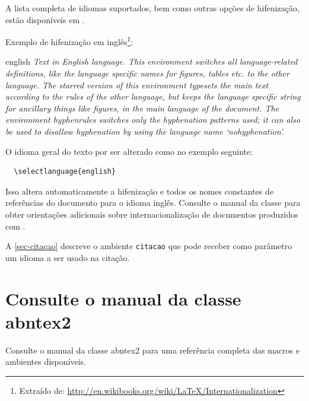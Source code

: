 A lista completa de idiomas suportados, bem como outras opções de hifenização,
estão disponíveis em .

Exemplo de hifenização em inglês\footnote{Extraído de:
\url{http://en.wikibooks.org/wiki/LaTeX/Internationalization}}:

\begin{otherlanguage*}{english}
\textit{Text in English language. This environment switches all language-related
definitions, like the language specific names for figures, tables etc. to the other
language. The starred version of this environment typesets the main text
according to the rules of the other language, but keeps the language specific
string for ancillary things like figures, in the main language of the document.
The environment hyphenrules switches only the hyphenation patterns used; it can
also be used to disallow hyphenation by using the language name
`nohyphenation'.}
\end{otherlanguage*}

% 

O idioma geral do texto por ser alterado como no exemplo seguinte:
\begin{verbatim}
  \selectlanguage{english}
\end{verbatim}

Isso altera automaticamente a hifenização e todos os nomes constantes de
referências do documento para o idioma inglês. Consulte o manual da classe
\cite{abntex2classe} para obter orientações adicionais sobre internacionalização de
documentos produzidos com \abnTeX.

A \autoref{sec-citacao} descreve o ambiente \texttt{citacao} que pode receber
como parâmetro um idioma a ser usado na citação.

\section{Consulte o manual da classe \textsf{abntex2}}

Consulte o manual da classe \textsf{abntex2} \cite{abntex2classe} para uma
referência completa das macros e ambientes disponíveis. 

